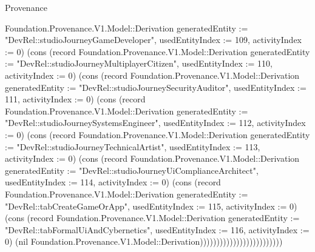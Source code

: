 \begin{lexlean}{Provenance}
\begin{semanticmodule}
{Foundation.Provenance.V1.Model::Derivation {generatedEntity := "DevRel::studioJourneyGameDeveloper", usedEntityIndex := 109, activityIndex := 0}) (cons (record Foundation.Provenance.V1.Model::Derivation {generatedEntity := "DevRel::studioJourneyMultiplayerCitizen", usedEntityIndex := 110, activityIndex := 0}) (cons (record Foundation.Provenance.V1.Model::Derivation {generatedEntity := "DevRel::studioJourneySecurityAuditor", usedEntityIndex := 111, activityIndex := 0}) (cons (record Foundation.Provenance.V1.Model::Derivation {generatedEntity := "DevRel::studioJourneySystemsEngineer", usedEntityIndex := 112, activityIndex := 0}) (cons (record Foundation.Provenance.V1.Model::Derivation {generatedEntity := "DevRel::studioJourneyTechnicalArtist", usedEntityIndex := 113, activityIndex := 0}) (cons (record Foundation.Provenance.V1.Model::Derivation {generatedEntity := "DevRel::studioJourneyUiComplianceArchitect", usedEntityIndex := 114, activityIndex := 0}) (cons (record Foundation.Provenance.V1.Model::Derivation {generatedEntity := "DevRel::tabCreateGameOrApp", usedEntityIndex := 115, activityIndex := 0}) (cons (record Foundation.Provenance.V1.Model::Derivation {generatedEntity := "DevRel::tabFormalUiAndCybernetics", usedEntityIndex := 116, activityIndex := 0}) (nil Foundation.Provenance.V1.Model::Derivation)))))))))))))))))))))))))
}


\end{semanticmodule}
\end{lexlean}
